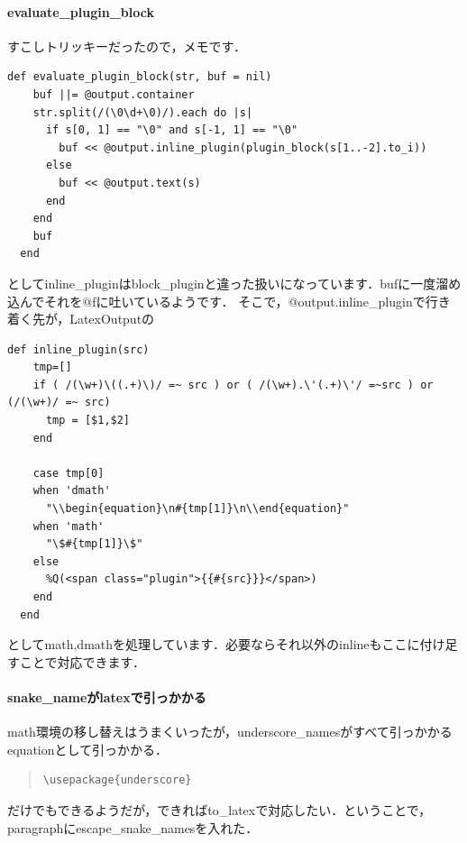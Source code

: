 \paragraph{evaluate\_plugin\_block}
すこしトリッキーだったので，メモです．
\begin{lstlisting}[style=customRuby]
  def evaluate_plugin_block(str, buf = nil)
    buf ||= @output.container
    str.split(/(\0\d+\0)/).each do |s|
      if s[0, 1] == "\0" and s[-1, 1] == "\0"
        buf << @output.inline_plugin(plugin_block(s[1..-2].to_i))
      else
        buf << @output.text(s)
      end
    end
    buf
  end
\end{lstlisting}
としてinline\_pluginはblock\_pluginと違った扱いになっています．bufに一度溜め込んでそれを@fに吐いているようです．
そこで，@output.inline\_pluginで行き着く先が，LatexOutputの
\begin{lstlisting}[style=customRuby]
  def inline_plugin(src)
    tmp=[]
    if ( /(\w+)\((.+)\)/ =~ src ) or ( /(\w+).\'(.+)\'/ =~src ) or (/(\w+)/ =~ src)
      tmp = [$1,$2]
    end

    case tmp[0]
    when 'dmath'
      "\\begin{equation}\n#{tmp[1]}\n\\end{equation}"
    when 'math'
      "\$#{tmp[1]}\$"
    else
      %Q(<span class="plugin">{{#{src}}}</span>)
    end
  end
\end{lstlisting}
としてmath,dmathを処理しています．必要ならそれ以外のinlineもここに付け足すことで対応できます．

\paragraph{snake\_nameがlatexで引っかかる}
math環境の移し替えはうまくいったが，underscore\_namesがすべて引っかかるequationとして引っかかる．
\begin{quote}\begin{verbatim}
\usepackage{underscore}
\end{verbatim}\end{quote}
だけでもできるようだが，できればto\_latexで対応したい．ということで，paragraphにescape\_snake\_namesを入れた．


